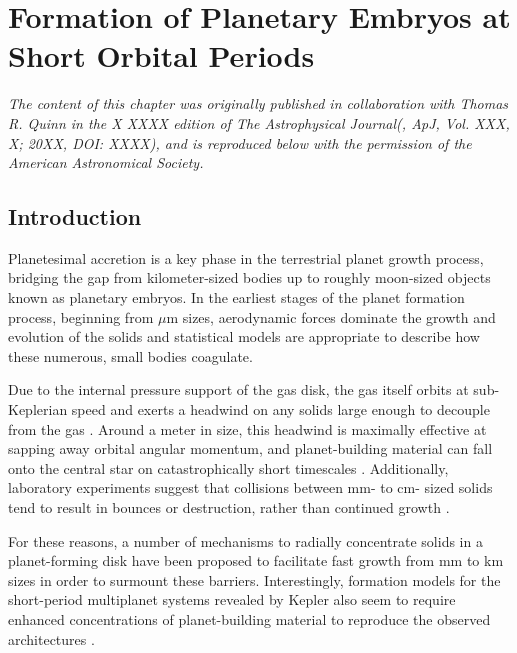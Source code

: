 \chapter {Formation of Planetary Embryos at Short Orbital Periods}\label{ch:stipPl}

\noindent \textit{The content of this chapter was originally published in collaboration with Thomas R. Quinn in the X XXXX edition of The Astrophysical Journal(\cite{wallace23}, ApJ, Vol. XXX, X; 20XX, DOI: XXXX), and is reproduced below with the permission of the American Astronomical Society.}

\section{Introduction} \label{sec:intro}

Planetesimal accretion is a key phase in the terrestrial planet growth
process, bridging the gap from kilometer-sized bodies up to roughly
moon-sized objects known as planetary embryos. In the earliest stages
of the planet formation process, beginning from $\mu$m sizes, aerodynamic forces dominate the
growth and evolution of the solids and statistical models
\cite{johansen14, birnstiel16} are appropriate to describe how these
numerous, small bodies coagulate. 

Due to the internal pressure support
of the gas disk, the gas itself orbits at sub-Keplerian speed and
exerts a headwind on any solids large enough to decouple from the gas
\cite{weidenschilling77}. Around a meter in size, this headwind
is maximally effective at sapping away orbital angular momentum, and planet-building material can fall onto the central star on 
catastrophically short timescales \cite{weidenschilling77, nakagawa86}. Additionally, laboratory experiments suggest that 
collisions between mm- to cm- sized solids tend to result in bounces or destruction, rather than continued growth
\cite{blum93, colwell03, beitz11}.

For these reasons, a number of mechanisms to radially concentrate solids in a planet-forming disk have been proposed to 
facilitate fast growth from mm to km sizes \cite{johansen07, lyra08, bai10} in order to surmount these barriers. Interestingly, 
formation models for the short-period multiplanet systems revealed by Kepler \cite{fabrycky14} also seem to require enhanced 
concentrations of planet-building material to reproduce the observed architectures \cite{raymond07, hansen12}.

